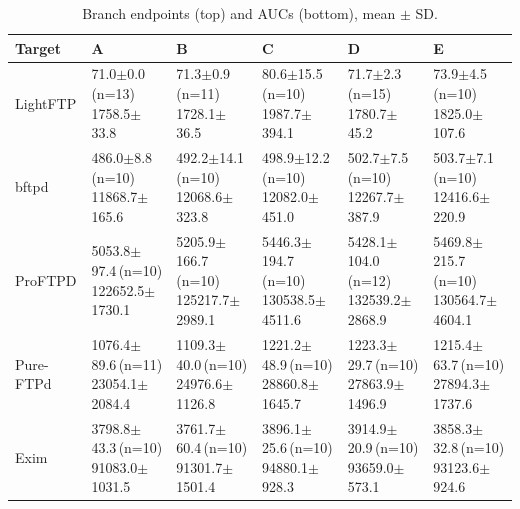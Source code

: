 \documentclass[final,5p,times,number]{elsarticle}
\begin{document}
\begin{table}[!tbp]
\centering\small
\caption{Branch endpoints (top) and AUCs (bottom), mean $\pm$ SD.}
\label{tab:mainresults}
\begin{tabularx}{\textwidth}{l *{5}{>{\centering\arraybackslash}X}}
\toprule
Target & A & B & C & D & E \\
\midrule
LightFTP & \shortstack{71.0$\pm$0.0\,(n=13)\\1758.5$\pm$33.8} & \shortstack{71.3$\pm$0.9\,(n=11)\\1728.1$\pm$36.5} & \shortstack{80.6$\pm$15.5\,(n=10)\\1987.7$\pm$394.1} & \shortstack{71.7$\pm$2.3\,(n=15)\\1780.7$\pm$45.2} & \shortstack{73.9$\pm$4.5\,(n=10)\\1825.0$\pm$107.6} \\
\addlinespace[3pt]
bftpd & \shortstack{486.0$\pm$8.8\,(n=10)\\11868.7$\pm$165.6} & \shortstack{492.2$\pm$14.1\,(n=10)\\12068.6$\pm$323.8} & \shortstack{498.9$\pm$12.2\,(n=10)\\12082.0$\pm$451.0} & \shortstack{502.7$\pm$7.5\,(n=10)\\12267.7$\pm$387.9} & \shortstack{503.7$\pm$7.1\,(n=10)\\12416.6$\pm$220.9} \\
\addlinespace[3pt]
ProFTPD & \shortstack{5053.8$\pm$97.4\,(n=10)\\122652.5$\pm$1730.1} & \shortstack{5205.9$\pm$166.7\,(n=10)\\125217.7$\pm$2989.1} & \shortstack{5446.3$\pm$194.7\,(n=10)\\130538.5$\pm$4511.6} & \shortstack{5428.1$\pm$104.0\,(n=12)\\132539.2$\pm$2868.9} & \shortstack{5469.8$\pm$215.7\,(n=10)\\130564.7$\pm$4604.1} \\
\addlinespace[3pt]
Pure-FTPd & \shortstack{1076.4$\pm$89.6\,(n=11)\\23054.1$\pm$2084.4} & \shortstack{1109.3$\pm$40.0\,(n=10)\\24976.6$\pm$1126.8} & \shortstack{1221.2$\pm$48.9\,(n=10)\\28860.8$\pm$1645.7} & \shortstack{1223.3$\pm$29.7\,(n=10)\\27863.9$\pm$1496.9} & \shortstack{1215.4$\pm$63.7\,(n=10)\\27894.3$\pm$1737.6} \\
\addlinespace[3pt]
Exim & \shortstack{3798.8$\pm$43.3\,(n=10)\\91083.0$\pm$1031.5} & \shortstack{3761.7$\pm$60.4\,(n=10)\\91301.7$\pm$1501.4} & \shortstack{3896.1$\pm$25.6\,(n=10)\\94880.1$\pm$928.3} & \shortstack{3914.9$\pm$20.9\,(n=10)\\93659.0$\pm$573.1} & \shortstack{3858.3$\pm$32.8\,(n=10)\\93123.6$\pm$924.6} \\

\end{tabularx}
\end{table}
\end{document}

